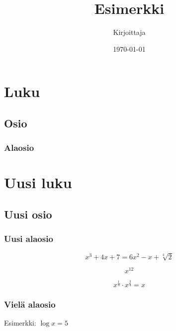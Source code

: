 \documentclass{book}
\begin{document}
\title{Esimerkki}
\author{Kirjoittaja}
\date{\today}
\maketitle

\tableofcontents

\chapter{Luku}

\section{Osio}

\subsection{Alaosio}

\Blindtext

\chapter{Uusi luku}

\section{Uusi osio}

\subsection{Uusi alaosio}

\[
x^3 + 4x + 7 = 6x^2 - x + \sqrt[4]{2}
\]

\[
x^{12}
\]

\[
x^{\frac{1}{4}} \cdot x^{\frac{3}{4}} = x
\]

\subsection{Vielä alaosio}

Esimerkki: $\log x = 5$
\end{document}
